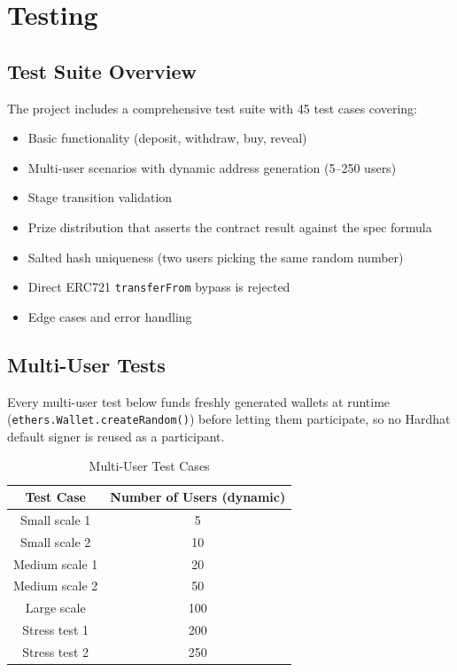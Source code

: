 \documentclass[12pt,a4paper]{article}
\begin{document}
\section{Testing}

\subsection{Test Suite Overview}

The project includes a comprehensive test suite with 45 test cases covering:
\begin{itemize}
    \item Basic functionality (deposit, withdraw, buy, reveal)
    \item Multi-user scenarios with dynamic address generation (5--250 users)
    \item Stage transition validation
    \item Prize distribution that asserts the contract result against the spec formula
    \item Salted hash uniqueness (two users picking the same random number)
    \item Direct ERC721 \texttt{transferFrom} bypass is rejected
    \item Edge cases and error handling
\end{itemize}

\subsection{Multi-User Tests}

Every multi-user test below funds freshly generated wallets at runtime
(\texttt{ethers.Wallet.createRandom()}) before letting them participate,
so no Hardhat default signer is reused as a participant.

\begin{table}[H]
    \centering
    \begin{tabular}{@{}cc@{}}
        \toprule
        \textbf{Test Case} & \textbf{Number of Users (dynamic)} \\
        \midrule
        Small scale 1 & 5 \\
        Small scale 2 & 10 \\
        Medium scale 1 & 20 \\
        Medium scale 2 & 50 \\
        Large scale & 100 \\
        Stress test 1 & 200 \\
        Stress test 2 & 250 \\
        \bottomrule
    \end{tabular}
    \caption{Multi-User Test Cases}
    \label{tab:multiuser}
\end{table}
\end{document}
